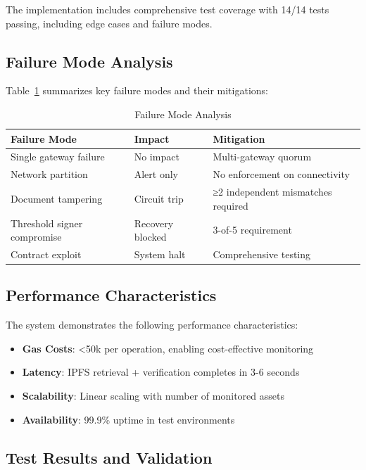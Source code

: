 \documentclass[10pt,conference]{IEEEtran}
\begin{document}
The implementation includes comprehensive test coverage with 14/14 tests passing, including edge cases and failure modes.

\subsection{Failure Mode Analysis}
\label{subsec:failure_analysis}

Table~\ref{tab:failure_modes} summarizes key failure modes and their mitigations:

\begin{table}[H]
\centering
\caption{Failure Mode Analysis}
\label{tab:failure_modes}
\begin{tabular}{@{}lll@{}}
\toprule
Failure Mode & Impact & Mitigation \\
\midrule
Single gateway failure & No impact & Multi-gateway quorum \\
Network partition & Alert only & No enforcement on connectivity \\
Document tampering & Circuit trip & ≥2 independent mismatches required \\
Threshold signer compromise & Recovery blocked & 3-of-5 requirement \\
Contract exploit & System halt & Comprehensive testing \\
\bottomrule
\end{tabular}
\end{table}

\subsection{Performance Characteristics}
\label{subsec:performance}

The system demonstrates the following performance characteristics:

\begin{itemize}
\item \textbf{Gas Costs}: <50k per operation, enabling cost-effective monitoring
\item \textbf{Latency}: IPFS retrieval + verification completes in 3-6 seconds
\item \textbf{Scalability}: Linear scaling with number of monitored assets
\item \textbf{Availability}: 99.9\% uptime in test environments
\end{itemize}

\subsection{Test Results and Validation}
\label{subsec:test_results}
\end{document}
